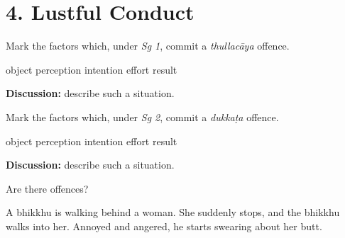 \chapter{4. Lustful Conduct}
\renewcommand*{\theChapterTitle}{4. Lustful Conduct}

\begin{exam}{\autoExamName}

\begin{problem*}

  \begin{parts}

  \item Mark the factors which, under \textit{Sg 1}, commit a \textit{thullacāya} offence.

    \bigskip

    \begin{answers}{6}
      \bChoices
       object\eAns
       perception\eAns
       intention\eAns
       effort\eAns
       result\eAns
      \eChoices
    \end{answers}

    \bigskip

    \textbf{Discussion:} describe such a situation.

    \bigskip

  \item Mark the factors which, under \textit{Sg 2}, commit a \textit{dukkaṭa} offence.

    \bigskip

    \begin{answers}{6}
      \bChoices
       object\eAns
       perception\eAns
       intention\eAns
       effort\eAns
       result\eAns
      \eChoices
    \end{answers}

    \bigskip

    \textbf{Discussion:} describe such a situation.

  \end{parts}

\end{problem*}

\problemDivide

\begin{problem*}

  Are there offences?

  \begin{parts}

  \item
    A bhikkhu is walking behind a woman. She suddenly stops, and the bhikkhu walks
    into her. Annoyed and angered, he starts swearing about her butt.


\end{parts}
\end{problem*}
\end{exam}
